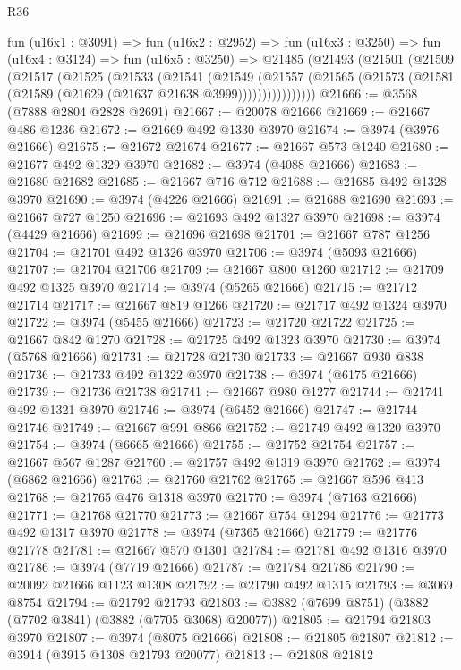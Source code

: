 \begin{lexlean}{R36}
\begin{coremodule}
    fun (u16x1 : @3091) =>
    fun (u16x2 : @2952) =>
    fun (u16x3 : @3250) =>
    fun (u16x4 : @3124) =>
    fun (u16x5 : @3250) =>
    @21485
      (@21493
        (@21501
          (@21509
            (@21517
              (@21525
                (@21533
                  (@21541
                    (@21549
                      (@21557
                        (@21565 (@21573 (@21581 (@21589 (@21629 (@21637 @21638 @3999))))))))))))))))
@21666 := @3568 (@7888 @2804 @2828 @2691)
@21667 := @20078 @21666
@21669 := @21667 @486 @1236
@21672 := @21669 @492 @1330 @3970
@21674 := @3974 (@3976 @21666)
@21675 := @21672 @21674
@21677 := @21667 @573 @1240
@21680 := @21677 @492 @1329 @3970
@21682 := @3974 (@4088 @21666)
@21683 := @21680 @21682
@21685 := @21667 @716 @712
@21688 := @21685 @492 @1328 @3970
@21690 := @3974 (@4226 @21666)
@21691 := @21688 @21690
@21693 := @21667 @727 @1250
@21696 := @21693 @492 @1327 @3970
@21698 := @3974 (@4429 @21666)
@21699 := @21696 @21698
@21701 := @21667 @787 @1256
@21704 := @21701 @492 @1326 @3970
@21706 := @3974 (@5093 @21666)
@21707 := @21704 @21706
@21709 := @21667 @800 @1260
@21712 := @21709 @492 @1325 @3970
@21714 := @3974 (@5265 @21666)
@21715 := @21712 @21714
@21717 := @21667 @819 @1266
@21720 := @21717 @492 @1324 @3970
@21722 := @3974 (@5455 @21666)
@21723 := @21720 @21722
@21725 := @21667 @842 @1270
@21728 := @21725 @492 @1323 @3970
@21730 := @3974 (@5768 @21666)
@21731 := @21728 @21730
@21733 := @21667 @930 @838
@21736 := @21733 @492 @1322 @3970
@21738 := @3974 (@6175 @21666)
@21739 := @21736 @21738
@21741 := @21667 @980 @1277
@21744 := @21741 @492 @1321 @3970
@21746 := @3974 (@6452 @21666)
@21747 := @21744 @21746
@21749 := @21667 @991 @866
@21752 := @21749 @492 @1320 @3970
@21754 := @3974 (@6665 @21666)
@21755 := @21752 @21754
@21757 := @21667 @567 @1287
@21760 := @21757 @492 @1319 @3970
@21762 := @3974 (@6862 @21666)
@21763 := @21760 @21762
@21765 := @21667 @596 @413
@21768 := @21765 @476 @1318 @3970
@21770 := @3974 (@7163 @21666)
@21771 := @21768 @21770
@21773 := @21667 @754 @1294
@21776 := @21773 @492 @1317 @3970
@21778 := @3974 (@7365 @21666)
@21779 := @21776 @21778
@21781 := @21667 @570 @1301
@21784 := @21781 @492 @1316 @3970
@21786 := @3974 (@7719 @21666)
@21787 := @21784 @21786
@21790 := @20092 @21666 @1123 @1308
@21792 := @21790 @492 @1315
@21793 := @3069 @8754
@21794 := @21792 @21793
@21803 := @3882 (@7699 @8751) (@3882 (@7702 @3841) (@3882 (@7705 @3068) @20077))
@21805 := @21794 @21803 @3970
@21807 := @3974 (@8075 @21666)
@21808 := @21805 @21807
@21812 := @3914 (@3915 @1308 @21793 @20077)
@21813 := @21808 @21812

\end{coremodule}
\end{lexlean}
